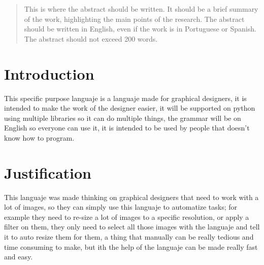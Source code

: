 \begin{abstract} %
    This is where the abstract should be written. It should be a 
    brief summary of the work, highlighting the main points of 
    the research. The abstract should be written in English, even 
    if the work is in Portuguese or Spanish. The abstract should 
    not exceed 200 words.
\end{abstract}
\section{Introduction}
This specific purpose languaje is a languaje made for graphical 
designers, it is intended to make the work of the designer easier, 
it will be supported on python using multiple libraries so it can 
do multiple things, the grammar will be on English so everyone can 
use it, it is intended to be used by people that doesn't know how 
to program.
\section{Justification}
This languaje was made thinking on graphical designers that need 
to work with a lot of images, so they can simply use this languaje 
to automatize tasks; for example they need to re-size a lot of 
images to a specific resolution, or apply a filter on them, they 
only need to select all those images with the languaje and tell it 
to auto resize them for them, a thing that manually can be really 
tedious and time consuming to make, but ith the help of the 
languaje can be made really fast and easy.